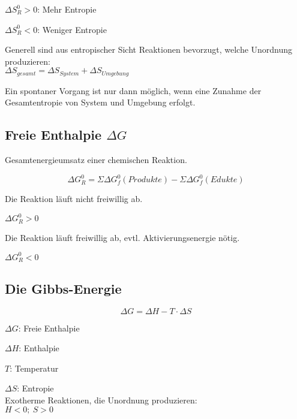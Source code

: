 \begin{definition}[Entropieänderung]
	$\Delta S^0_R > 0$: Mehr Entropie
	
	$\Delta S^0_R < 0$: Weniger Entropie
\end{definition}

Generell sind aus entropischer Sicht Reaktionen bevorzugt, welche Unordnung produzieren: \\
$\Delta S_{gesamt} = \Delta S_{System} + \Delta S_{Umgebung}$

Ein spontaner Vorgang ist nur dann möglich, wenn eine Zunahme der Gesamtentropie von System und Umgebung erfolgt.


\subsection{Freie Enthalpie $\Delta G$}

Gesamtenergieumsatz einer chemischen Reaktion.

{\large
	\begin{equation}
		\Delta G^0_R = \Sigma \Delta G^0_f (Produkte) - \Sigma \Delta G^0_f (Edukte)
	\end{equation}
}

\begin{definition}
	Die Reaktion läuft nicht freiwillig ab.
	
	$\Delta G^0_R > 0$
\end{definition}

\begin{definition}
	Die Reaktion läuft freiwillig ab, evtl. Aktivierungsenergie nötig.
	
	$\Delta G^0_R < 0$
\end{definition}

\subsection{Die Gibbs-Energie}

{\large
	\begin{equation}
		\Delta G = \Delta H - T\cdot \Delta S
	\end{equation}
}

$\Delta G$: Freie Enthalpie

$\Delta H$: Enthalpie

$T$: Temperatur

$\Delta S$: Entropie \\

Exotherme Reaktionen, die Unordnung produzieren: \\ $H<0; \ S>0$
\\

